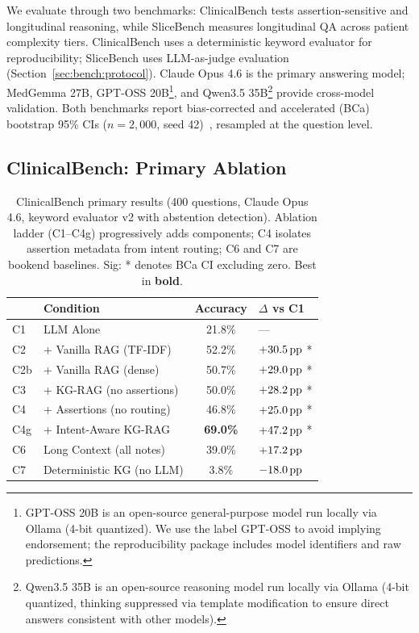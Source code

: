 
We evaluate \epikg through two benchmarks: ClinicalBench tests assertion-sensitive and longitudinal reasoning, while SliceBench measures longitudinal QA across patient complexity tiers.
ClinicalBench uses a deterministic keyword evaluator for reproducibility; SliceBench uses LLM-as-judge evaluation (Section~\ref{sec:bench:protocol}).
Claude Opus 4.6 is the primary answering model; MedGemma 27B, GPT-OSS 20B\footnote{GPT-OSS 20B is an open-source general-purpose model run locally via Ollama (4-bit quantized). We use the label GPT-OSS to avoid implying endorsement; the reproducibility package includes model identifiers and raw predictions.}, and Qwen3.5 35B\footnote{Qwen3.5 35B is an open-source reasoning model run locally via Ollama (4-bit quantized, thinking suppressed via template modification to ensure direct answers consistent with other models).} provide cross-model validation.
Both benchmarks report bias-corrected and accelerated (BCa) bootstrap 95\% CIs ($n=2{,}000$, seed 42)~\cite{efron1993bootstrap}, resampled at the question level.

\subsection{ClinicalBench: Primary Ablation}
\label{sec:results:clinicalbench}

\begin{table}[t]
\centering
\caption{ClinicalBench primary results (400 questions, Claude Opus 4.6, keyword evaluator v2 with abstention detection). Ablation ladder (C1--C4g) progressively adds components; C4 isolates assertion metadata from intent routing; C6 and C7 are bookend baselines. Sig: * denotes BCa CI excluding zero. Best in \textbf{bold}.}
\label{tab:clinicalbench_ablation}
\small
\begin{tabular}{@{}llcl@{}}
\toprule
& Condition & Accuracy & $\Delta$ vs C1 \\
\midrule
C1 & LLM Alone & 21.8\% & --- \\
C2 & + Vanilla RAG (TF-IDF) & 52.2\% & $+30.5\,\text{pp}$ * \\
C2b & + Vanilla RAG (dense) & 50.7\% & $+29.0\,\text{pp}$ * \\
C3 & + KG-RAG (no assertions) & 50.0\% & $+28.2\,\text{pp}$ * \\
C4 & + Assertions (no routing) & 46.8\% & $+25.0\,\text{pp}$ * \\
C4g & + Intent-Aware KG-RAG & \textbf{69.0\%} & $+47.2\,\text{pp}$ * \\
\midrule
C6 & Long Context (all notes) & 39.0\% & $+17.2\,\text{pp}$ \\
C7 & Deterministic KG (no LLM) & 3.8\% & $-18.0\,\text{pp}$ \\
\bottomrule
\end{tabular}
\end{table}

